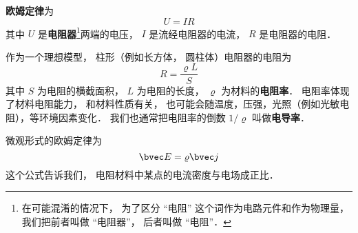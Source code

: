

\textbf{欧姆定律}为
\begin{equation}
U = IR
\end{equation}
其中 $U$ 是\textbf{电阻器}\footnote{在可能混淆的情况下， 为了区分 “电阻” 这个词作为电路元件和作为物理量， 我们把前者叫做 “电阻器”， 后者叫做 “电阻”．}两端的电压， $I$ 是流经电阻器的电流， $R$ 是电阻器的电阻．

作为一个理想模型， 柱形（例如长方体， 圆柱体）电阻器的电阻为
\begin{equation}
R = \frac{\varrho L}{S}
\end{equation}
其中 $S$ 为电阻的横截面积， $L$ 为电阻的长度， $\varrho$ 为材料的\textbf{电阻率}． 电阻率体现了材料电阻能力， 和材料性质有关， 也可能会随温度，压强，光照（例如光敏电阻），等环境因素变化． 我们也通常把电阻率的倒数 $1/\varrho$ 叫做\textbf{电导率}．

微观形式的欧姆定律为
\begin{equation}
\bvec E = \varrho\bvec j
\end{equation}
这个公式告诉我们， 电阻材料中某点的电流密度与电场成正比．

